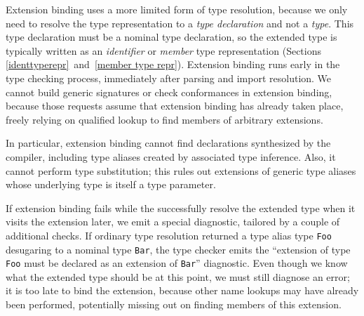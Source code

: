 \documentclass[../generics]{subfiles}
\begin{document}
Extension binding uses a more limited form of type resolution, because we only need to resolve the type representation to a \emph{type declaration} and not a \emph{type}. This type declaration must be a nominal type declaration, so the extended type is typically written as an \emph{identifier} or \emph{member} type representation (Sections \ref{identtyperepr}~and~\ref{member type repr}). Extension binding runs early in the type checking process, immediately after parsing and import resolution. We cannot build generic signatures or check conformances in extension binding, because those requests assume that extension binding has already taken place, freely relying on qualified lookup to find members of arbitrary extensions.

In particular, extension binding cannot find declarations synthesized by the compiler, including type aliases created by associated type inference. Also, it cannot perform type substitution; this rules out extensions of generic type aliases whose underlying type is itself a type parameter.

If extension binding fails while the  successfully resolve the extended type when it visits the extension later, we emit a special diagnostic, tailored by a couple of additional checks. If ordinary type resolution returned a type alias type \texttt{Foo} desugaring to a nominal type \texttt{Bar}, the type checker emits the ``extension of type \texttt{Foo} must be declared as an extension of \texttt{Bar}'' diagnostic. Even though we know what the extended type should be at this point, we must still diagnose an error; it is too late to bind the extension, because other name lookups may have already been performed, potentially missing out on finding members of this extension.
\end{document}
